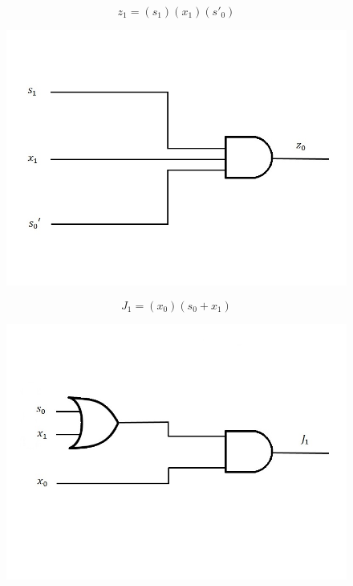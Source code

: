 \documentclass{article}
\begin{document}
\begin{equation*}
z_1 = (s_1)(x_1)(s'_0)
\end{equation*}
\begin{figure}[h!]
\centering
\includegraphics[scale=0.3]{z0}
\end{figure}

\clearpage

\begin{equation*}
J_1 = (x_0)(s_0 + x_1)
\end{equation*}
\begin{figure}[h!]
\centering
\includegraphics[scale=0.3]{J1}
\end{figure}
\end{document}
